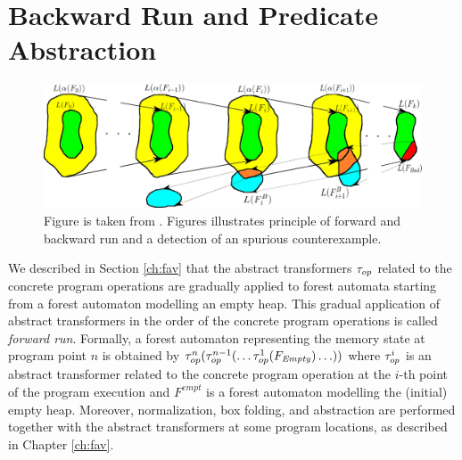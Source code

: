 \section{Backward Run and Predicate Abstraction}
\label{sec:br}

\begin{figure}[t]
	\centering
	\includegraphics[scale=0.35]{fig/artmc.png}
	\caption{
		Figure is taken from \cite{artmc}.
		Figures illustrates principle of forward and backward run and
		a detection of an spurious counterexample.}
	\label{fig:bwrun}
\end{figure}

We described in Section \ref{ch:fav} that the abstract transformers $\tau_{op}$
related to the concrete program operations are gradually applied to forest automata
starting from a forest automaton modelling an empty heap.
This gradual application of abstract transformers in the order of
the concrete program operations is called \emph{forward run}.
Formally, a forest automaton representing the memory state 
at program point $n$ is obtained by
$\tau_{op}^n(\tau_{op}^{n-1}(\ldots \tau_{op}^{1}(F_\mathit{Empty}) \ldots))$
where $\tau_{op}^i$ is an abstract transformer related to the concrete
program operation at the $i$-th point of the program execution and
$F^{empt}$ is a forest automaton modelling the (initial) empty heap.
Moreover, normalization, box folding, and abstraction are performed
together with the abstract transformers at some program locations,
as described in Chapter \ref{ch:fav}.


